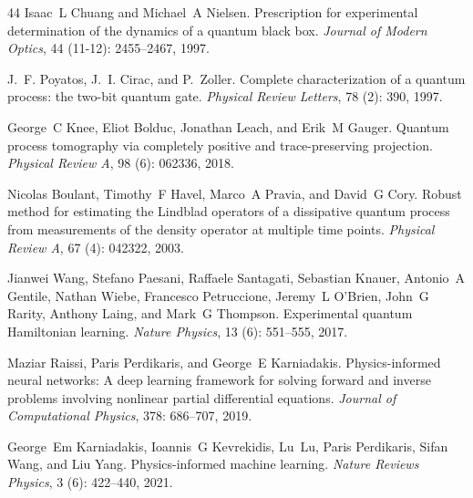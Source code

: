 \documentclass[11pt]{article}
\begin{document}
\begin{thebibliography}{44}
Isaac~L Chuang and Michael~A Nielsen.
\newblock Prescription for experimental determination of the dynamics of a
  quantum black box.
\newblock \emph{Journal of Modern Optics}, 44 (11-12):
  2455--2467, 1997.

J.~F. Poyatos, J.~I. Cirac, and P.~Zoller.
\newblock Complete characterization of a quantum process: the two-bit quantum
  gate.
\newblock \emph{Physical Review Letters}, 78 (2): 390, 1997.

George~C Knee, Eliot Bolduc, Jonathan Leach, and Erik~M Gauger.
\newblock Quantum process tomography via completely positive and
  trace-preserving projection.
\newblock \emph{Physical Review A}, 98 (6): 062336, 2018.

Nicolas Boulant, Timothy~F Havel, Marco~A Pravia, and David~G Cory.
\newblock Robust method for estimating the {Lindblad} operators of a
  dissipative quantum process from measurements of the density operator at
  multiple time points.
\newblock \emph{Physical Review A}, 67 (4): 042322, 2003.

Jianwei Wang, Stefano Paesani, Raffaele Santagati, Sebastian Knauer, Antonio~A
  Gentile, Nathan Wiebe, Francesco Petruccione, Jeremy~L O'Brien, John~G
  Rarity, Anthony Laing, and Mark~G Thompson.
\newblock Experimental quantum {Hamiltonian} learning.
\newblock \emph{Nature Physics}, 13 (6): 551--555, 2017.

Maziar Raissi, Paris Perdikaris, and George~E Karniadakis.
\newblock Physics-informed neural networks: A deep learning framework for
  solving forward and inverse problems involving nonlinear partial differential
  equations.
\newblock \emph{Journal of Computational Physics}, 378: 686--707,
  2019.

George~Em Karniadakis, Ioannis~G Kevrekidis, Lu~Lu, Paris Perdikaris, Sifan
  Wang, and Liu Yang.
\newblock Physics-informed machine learning.
\newblock \emph{Nature Reviews Physics}, 3 (6): 422--440,
  2021.


\end{thebibliography}
\end{document}
